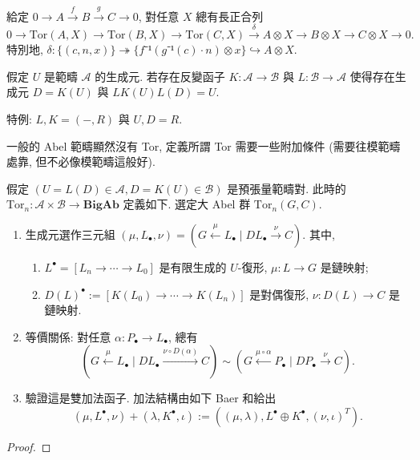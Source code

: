 \begin{proposition}[第一處連接態射]
    給定 $0 → A \xrightarrow f B \xrightarrow g C → 0$, 對任意 $X$ 總有長正合列 
    \begin{equation}
        0 → \mathrm{Tor}(A, X) → \mathrm{Tor}(B, X) → \mathrm{Tor}(C, X) \xrightarrow δ A ⊗ X → B ⊗ X → C ⊗ X → 0. 
    \end{equation}
    特別地, $δ : \{(c, n ,x) \} ↠ \{f⁻¹ (g⁻¹ (c) ⋅ n) ⊗ x\} ↪ A ⊗ X$. 
\end{proposition}

\begin{definition}[生成對]
    假定 $U$ 是範疇 $𝒜$ 的生成元.  若存在反變函子 $K: 𝒜 → ℬ$ 與 $L: ℬ → 𝒜$ 使得存在生成元 $D = K(U)$ 與 $LK(U) L(D) = U$. 
\end{definition}

\begin{remark}
    特例: $L, K = (-, R)$ 與 $U,D = R$.  
\end{remark}

\begin{definition}
    \begin{pinked}
    一般的 Abel 範疇顯然沒有 Tor, 定義所謂 Tor 需要一些附加條件 (需要往模範疇處靠, 但不必像模範疇這般好).
    \end{pinked}
    假定 $(U = L(D) ∈ 𝒜, D = K(U) ∈ ℬ)$ 是預張量範疇對. 此時的 $\mathrm{Tor}_n : 𝒜 × ℬ → 𝐁𝐢𝐠𝐀𝐛$ 定義如下. 選定大 Abel 群 $\mathrm{Tor}_n (G, C)$. 
    \begin{enumerate}
        \item 生成元選作三元組 $(μ, L_∙,ν) = (G\xleftarrow μ L_∙ ∣ DL_∙ \xrightarrow ν C)$. 其中, 
        \begin{enumerate}
            \item $L^∙ = [L_n → \cdots → L_0]$ 是有限生成的 $U$-復形, $μ:L → G$ 是鏈映射; 
            \item $D(L)^∙ := [K(L_0) → \cdots → K(L_n)]$ 是對偶復形, $ν: D(L) → C$ 是鏈映射. 
        \end{enumerate}
        \item 等價關係: 對任意 $α : P_∙ → L_∙$, 總有
        \begin{equation}
            (G\xleftarrow{μ} L_∙ ∣ DL_∙ \xrightarrow {ν ∘ D(α)} C) ∼ (G\xleftarrow {μ ∘ α} P_∙ ∣ DP_∙ \xrightarrow {ν} C). 
        \end{equation}
        \item 驗證這是雙加法函子. 加法結構由如下 Baer 和給出
        \begin{equation}
            (μ, L^∙,ν) + (λ, K^∙,ι) := ((μ, λ), L^∙ ⊕ K^∙, (ν, ι)^T).  
        \end{equation}
    \end{enumerate} 
    \begin{proof}
    \end{proof}
\end{definition}

